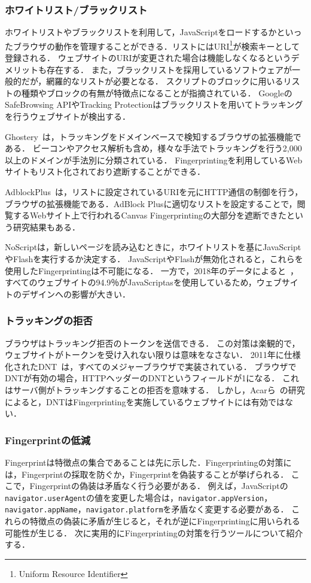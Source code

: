 \subsubsection{ホワイトリスト/ブラックリスト}
ホワイトリストやブラックリストを利用して，JavaScriptをロードするかといったブラウザの動作を管理することができる．リストにはURI\footnote{Uniform Resource Identifier}が検索キーとして登録される．
ウェブサイトのURIが変更された場合は機能しなくなるというデメリットも存在する．
また，ブラックリストを採用しているソフトウェアが一般的だが，網羅的なリストが必要となる．
スクリプトのブロックに用いるリストの種類やブロックの有無が特徴点になることが指摘されている．
GoogleのSafeBrowsing APIやTracking Protectionはブラックリストを用いてトラッキングを行うウェブサイトが検出する．

Ghostery~\cite{Ghostery}は，トラッキングをドメインベースで検知するブラウザの拡張機能である．
ビーコンやアクセス解析も含め，様々な手法でトラッキングを行う2,000以上のドメインが手法別に分類されている．
Fingerprintingを利用しているWebサイトもリスト化されており遮断することができる．

AdblockPlus~\cite{acar2014web}は，リストに設定されているURIを元にHTTP通信の制御を行う，ブラウザの拡張機能である．AdBlock Plusに適切なリストを設定することで，閲覧するWebサイト上で行われるCanvas Fingerprintingの大部分を遮断できたという研究結果もある．

NoScriptは，新しいページを読み込むときに，ホワイトリストを基にJavaScriptやFlashを実行するか決定する．
JavaScriptやFlashが無効化されると，これらを使用したFingerprintingは不可能になる．
一方で，2018年のデータによると~\cite{javascript_usage}，すべてのウェブサイトの94.9％がJavaScriptasを使用しているため，ウェブサイトのデザインへの影響が大きい．
\subsubsection{トラッキングの拒否}
ブラウザはトラッキング拒否のトークンを送信できる．
この対策は楽観的で，ウェブサイトがトークンを受け入れない限りは意味をなさない．
2011年に仕様化されたDNT~\cite{dnt}は，すべてのメジャーブラウザで実装されている．
ブラウザでDNTが有効の場合，HTTPヘッダーのDNTというフィールドが1になる．
これはサーバ側がトラッキングすることの拒否を意味する．
しかし，Acarら~\cite{acar2013fpdetective}の研究によると，DNTはFingerprintingを実施しているウェブサイトには有効ではない．
\subsubsection{Fingerprintの低減}
Fingerprintは特徴点の集合であることは先に示した．Fingerprintingの対策には，Fingerprintの採取を防ぐか，Fingerprintを偽装することが挙げられる．
ここで，Fingerprintの偽装は矛盾なく行う必要がある．
例えば，JavaScriptの\texttt{navigator.userAgent}の値を変更した場合は，\texttt{navigator.appVersion}，\texttt{navigator.appName}，\texttt{navigator.platform}を矛盾なく変更する必要がある．
これらの特徴点の偽装に矛盾が生じると，それが逆にFingerprintingに用いられる可能性が生じる．
次に実用的にFingerprintingの対策を行うツールについて紹介する．

